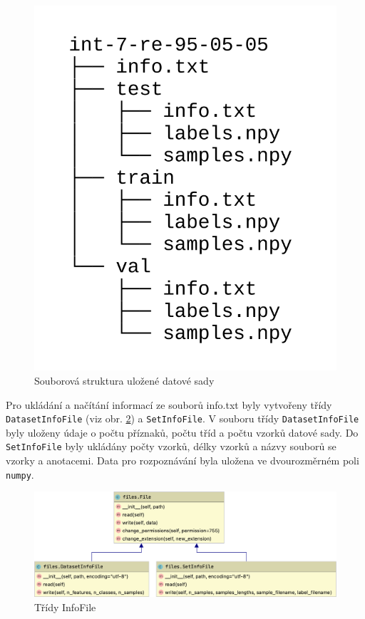 \documentclass[FM,BP]{tulthesis}
\begin{document}
\begin{figure}[ht]
\centerline{\includegraphics[scale=.22]{dataset_file_structure.png}}
\caption{Souborová struktura uložené datové sady}
\label{fig:file_structure}
\end{figure}
\FloatBarrier

Pro ukládání a načítání informací ze souborů info.txt byly vytvořeny třídy \texttt{\mbox{DatasetInfoFile}} (viz obr. \mbox{\ref{fig:info_files}}) a \texttt{\mbox{SetInfoFile}}. V souboru třídy \texttt{\mbox{DatasetInfoFile}} byly uloženy údaje o počtu příznaků, počtu tříd a počtu vzorků datové sady. Do \texttt{\mbox{SetInfoFile}} byly ukládány počty vzorků, délky vzorků a názvy souborů se vzorky a anotacemi. Data pro rozpoznávání byla uložena ve dvourozměrném poli \texttt{\mbox{numpy}}.

\begin{figure}[ht]
\centerline{\includegraphics[scale=.25]{files-info.png}}
\caption{Třídy InfoFile}
\label{fig:info_files}
\end{figure}
\FloatBarrier
\end{document}
